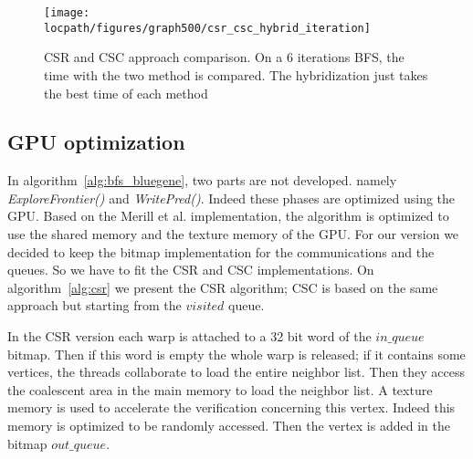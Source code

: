 \begin{figure}[!t]
	\centering
	\texttt{[image: \\locpath/figures/graph500/csr\_csc\_hybrid\_iteration]}
	\caption{CSR and CSC approach comparison. On a 6 iterations BFS, the time with the two method is compared. The hybridization just takes the best time of each method}
	\label{fig:csr_csc}
\end{figure}

\subsection{GPU optimization}

In algorithm~\ref{alg:bfs_bluegene}, two parts are not developed. namely \textit{ExploreFrontier()} and \textit{WritePred()}. Indeed these phases are optimized using the GPU. 
Based on the Merill et al. implementation, the algorithm is optimized to use the shared memory and the texture memory of the GPU. 
For our version we decided to keep the bitmap implementation for the communications and the queues. So we have to fit the CSR and CSC implementations. 
On algorithm~\ref{alg:csr} we present the CSR algorithm;
CSC is based on the same approach but starting from the $visited$ queue. 

In the CSR version each warp is attached to a 32 bit word of the $in\_queue$ bitmap. 
Then if this word is empty the whole warp is released; 
if it contains some vertices, the threads collaborate to load the entire neighbor list. 
Then they access the coalescent area in the main memory to load the neighbor list. 
A texture memory is used to accelerate the verification concerning this vertex. Indeed this memory is optimized to be randomly accessed. 
Then the vertex is added in the bitmap $out\_queue$.

